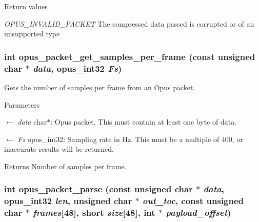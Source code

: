 \begin{DoxyRetVals}{Return values}
\item[{\em OPUS\_\-INVALID\_\-PACKET}]The compressed data passed is corrupted or of an unsupported type \end{DoxyRetVals}
\hypertarget{group__opus__decoder_gab2a955acced631c6cb7876bbdc7953d4}{
\subsubsection[{opus\_\-packet\_\-get\_\-samples\_\-per\_\-frame}]{\setlength{\rightskip}{0pt plus 5cm}int opus\_\-packet\_\-get\_\-samples\_\-per\_\-frame (const unsigned char $\ast$ {\em data}, \/  {\bf opus\_\-int32} {\em Fs})}}
\label{group__opus__decoder_gab2a955acced631c6cb7876bbdc7953d4}


Gets the number of samples per frame from an Opus packet. 
\begin{DoxyParams}{Parameters}
\item[\mbox{$\leftarrow$} {\em data}]{\ttfamily char$\ast$}: Opus packet. This must contain at least one byte of data. \item[\mbox{$\leftarrow$} {\em Fs}]{\ttfamily opus\_\-int32}: Sampling rate in Hz. This must be a multiple of 400, or inaccurate results will be returned. \end{DoxyParams}
\begin{DoxyReturn}{Returns}
Number of samples per frame. 
\end{DoxyReturn}
\hypertarget{group__opus__decoder_ga3426076e549ac8d02e9a4d0e681d498e}{
\subsubsection[{opus\_\-packet\_\-parse}]{\setlength{\rightskip}{0pt plus 5cm}int opus\_\-packet\_\-parse (const unsigned char $\ast$ {\em data}, \/  {\bf opus\_\-int32} {\em len}, \/  unsigned char $\ast$ {\em out\_\-toc}, \/  const unsigned char $\ast$ {\em frames}\mbox{[}48\mbox{]}, \/  short {\em size}\mbox{[}48\mbox{]}, \/  int $\ast$ {\em payload\_\-offset})}}
\label{group__opus__decoder_ga3426076e549ac8d02e9a4d0e681d498e}


